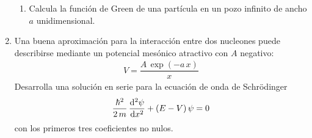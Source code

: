 \begin{enumerate}
\begin{enumerate}
\item Calcula la función de Green de una partícula en un pozo infinito de ancho $a$ unidimensional.
\end{enumerate}
\item Una buena aproximación para la interacción entre dos nucleones puede describirse mediante un potencial mesónico atractivo con $A$ negativo:
\begin{align*}
V = \dfrac{A \, \exp(- a \, x)}{x}
\end{align*}
Desarrolla una solución en serie para la ecuación de onda de Schrödinger
\begin{align*}
\dfrac{\hbar^{2}}{2 \, m} \, \dv[2]{\psi}{x} + (E - V) \, \psi = 0
\end{align*}
con los primeros tres coeficientes no nulos.
\end{enumerate}
